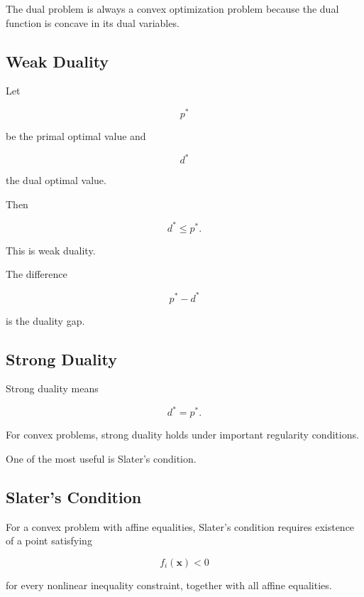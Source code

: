 The dual problem is always a convex optimization problem because the dual
function is concave in its dual variables.

\subsection{Weak Duality}
\label{subsec:convex-weak-duality}

Let

\[
p^*
\]

be the primal optimal value and

\[
d^*
\]

the dual optimal value.

Then

\[
\boxed{
d^*\leq p^*.
}
\]

This is weak duality.

The difference

\[
\boxed{
p^*-d^*
}
\]

is the duality gap.

\subsection{Strong Duality}
\label{subsec:convex-strong-duality}

Strong duality means

\[
\boxed{
d^*=p^*.
}
\]

For convex problems, strong duality holds under important regularity
conditions.

One of the most useful is Slater's condition.

\subsection{Slater's Condition}
\label{subsec:slaters-condition}

For a convex problem with affine equalities, Slater's condition requires
existence of a point satisfying

\[
\boxed{
f_i(\mathbf{x})<0
}
\]

for every nonlinear inequality constraint, together with all affine
equalities.

